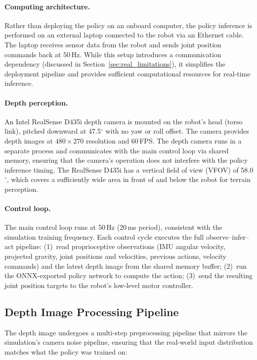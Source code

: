 \paragraph{Computing architecture.}
Rather than deploying the policy on an onboard computer, the policy inference is performed on an external laptop connected to the robot via an Ethernet cable. The laptop receives sensor data from the robot and sends joint position commands back at 50\,Hz. While this setup introduces a communication dependency (discussed in Section~\ref{sec:real_limitations}), it simplifies the deployment pipeline and provides sufficient computational resources for real-time inference.

\paragraph{Depth perception.}
An Intel RealSense D435i depth camera is mounted on the robot's head (torso link), pitched downward at 47.5$^\circ$ with no yaw or roll offset. The camera provides depth images at $480 \times 270$ resolution and 60\,FPS. The depth camera runs in a separate process and communicates with the main control loop via shared memory, ensuring that the camera's operation does not interfere with the policy inference timing. The RealSense D435i has a vertical field of view (VFOV) of 58.0$^\circ$, which covers a sufficiently wide area in front of and below the robot for terrain perception.

\paragraph{Control loop.}
The main control loop runs at 50\,Hz (20\,ms period), consistent with the simulation training frequency. Each control cycle executes the full observe--infer--act pipeline: (1)~read proprioceptive observations (IMU angular velocity, projected gravity, joint positions and velocities, previous actions, velocity commands) and the latest depth image from the shared memory buffer; (2)~run the ONNX-exported policy network to compute the action; (3)~send the resulting joint position targets to the robot's low-level motor controller.

\subsection{Depth Image Processing Pipeline}
\label{sec:depth_pipeline}

The depth image undergoes a multi-step preprocessing pipeline that mirrors the simulation's camera noise pipeline, ensuring that the real-world input distribution matches what the policy was trained on:

